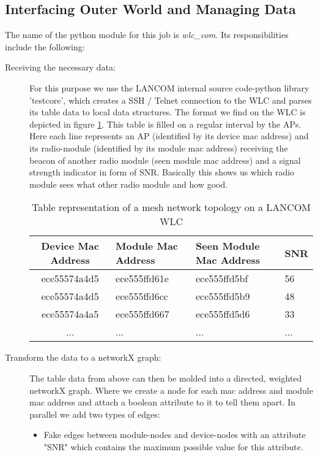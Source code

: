     \subsection{Interfacing Outer World and Managing Data}
      The name of the python module for this job is \textit{wlc\_com}. Its responsibilities include the following:
      \begin{description}
	\item[Receiving the necessary data:]
	  For this purpose we use the LANCOM internal source code-python library 'testcore', which creates a \ac{SSH} / Telnet connection to the 
	  \ac{WLC} and parses its table data to local data structures.
	  The format we find on the \ac{WLC} is depicted in figure \ref{tab:wlc}. This table is filled on a regular interval by the APs.
	  Here each line represents an \ac{AP} (identified by its device mac address) and its radio-module (identified by its module mac address) receiving the beacon
	  of another radio module (seen module mac address) and a signal strength indicator in form of \ac{SNR}. Basically this shows us which radio module 
	  sees what other radio module and how good.
	  \begin{table}[h!]
	    \begin{tabular}{clll}
	      Device Mac Address & Module Mac Address & Seen Module Mac Address & \ac{SNR}\\ \hline
	      ece55574a4d5 & ece555ffd61e & ece555ffd5bf & 56 \\
	      ece55574a4d5 & ece555ffd6cc & ece555ffd5b9 & 48 \\
	      ece55574a4a5 & ece555ffd667 & ece555ffd5d6 & 33 \\
	      ... & ... & ... & ...
	    \end{tabular}
	    \caption{Table representation of a mesh network topology on a LANCOM \ac{WLC}}
	    \label{tab:wlc}
	  \end{table}
	  
\newpage
	
	\item [Transform the data to a networkX graph:]
	  The table data from above can then be molded into a directed, weighted networkX graph. 
	  Where we create a node for each mac address and module mac address and attach a boolean attribute to it to tell them apart. 
	  In parallel we add two types of edges:

	  \begin{itemize}
	    \item Fake edges between module-nodes and device-nodes with an attribute "SNR" which contains the maximum possible value for this attribute.
	    

\end{itemize}
\end{description}
